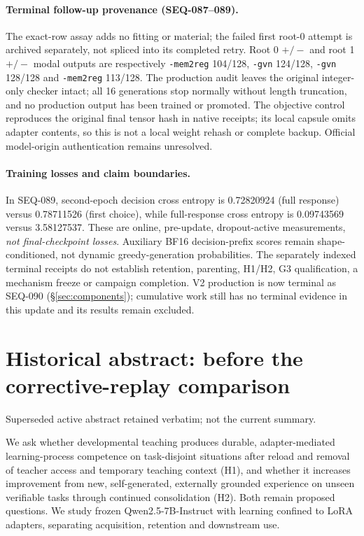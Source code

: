 \documentclass{article}
\begin{document}
\paragraph{Terminal follow-up provenance (SEQ-087--089).} The exact-row assay adds no fitting or material; the failed first root-0 attempt is archived separately, not spliced into its completed retry. Root 0 $+/-$ and root 1 $+/-$ modal outputs are respectively \texttt{-mem2reg} 104/128, \texttt{-gvn} 124/128, \texttt{-gvn} 128/128 and \texttt{-mem2reg} 113/128. The production audit leaves the original integer-only checker intact; all 16 generations stop normally without length truncation, and no production output has been trained or promoted. The objective control reproduces the original final tensor hash in native receipts; its local capsule omits adapter contents, so this is not a local weight rehash or complete backup. Official model-origin authentication remains unresolved.

\paragraph{Training losses and claim boundaries.} In SEQ-089, second-epoch decision cross entropy is 0.72820924 (full response) versus 0.78711526 (first choice), while full-response cross entropy is 0.09743569 versus 3.58127537. These are online, pre-update, dropout-active measurements, \emph{not final-checkpoint losses}. Auxiliary BF16 decision-prefix scores remain shape-conditioned, not dynamic greedy-generation probabilities. The separately indexed terminal receipts do not establish retention, parenting, H1/H2, G3 qualification, a mechanism freeze or campaign completion. V2 production is now terminal as SEQ-090 (\S\ref{sec:components}); cumulative work still has no terminal evidence in this update and its results remain excluded.

\section*{Historical abstract: before the corrective-replay comparison}
\noindent Superseded active abstract retained verbatim; not the current summary.

We ask whether developmental teaching produces durable, adapter-mediated
learning-process competence on task-disjoint situations after reload and
removal of teacher access and temporary teaching context (H1), and whether it
increases improvement from new, self-generated, externally grounded experience
on unseen verifiable tasks through continued consolidation (H2). Both remain
proposed questions. We study frozen Qwen2.5-7B-Instruct with learning confined
to LoRA adapters, separating acquisition, retention and downstream use.
\end{document}
